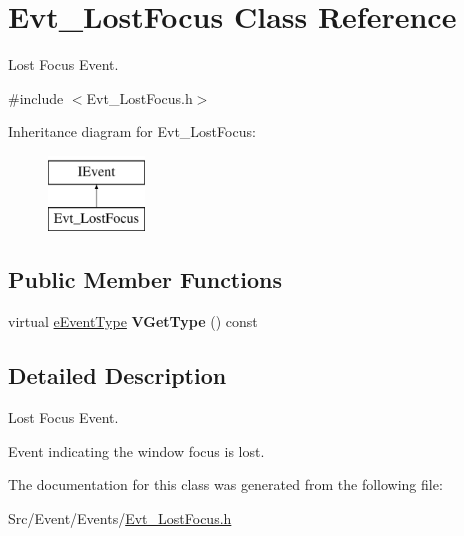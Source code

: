 \hypertarget{classEvt__LostFocus}{\section{Evt\-\_\-\-Lost\-Focus Class Reference}
\label{classEvt__LostFocus}
}


Lost Focus Event.  




{\ttfamily \#include $<$Evt\-\_\-\-Lost\-Focus.\-h$>$}

Inheritance diagram for Evt\-\_\-\-Lost\-Focus\-:\begin{figure}[H]
\begin{center}
\leavevmode
\includegraphics[height=2.000000cm]{classEvt__LostFocus}
\end{center}
\end{figure}
\subsection*{Public Member Functions}
\begin{DoxyCompactItemize}
\item 
\hypertarget{classEvt__LostFocus_a52fe9c7fad6ce0fa67caecd1dd3eff64}{virtual \hyperlink{IEvent_8h_a052e637824ed8cb8a5e9d5d73b5b3c8b}{e\-Event\-Type} {\bfseries V\-Get\-Type} () const }\label{classEvt__LostFocus_a52fe9c7fad6ce0fa67caecd1dd3eff64}

\end{DoxyCompactItemize}


\subsection{Detailed Description}
Lost Focus Event. 

Event indicating the window focus is lost. 

The documentation for this class was generated from the following file\-:\begin{DoxyCompactItemize}
\item 
Src/\-Event/\-Events/\hyperlink{Evt__LostFocus_8h}{Evt\-\_\-\-Lost\-Focus.\-h}\end{DoxyCompactItemize}
